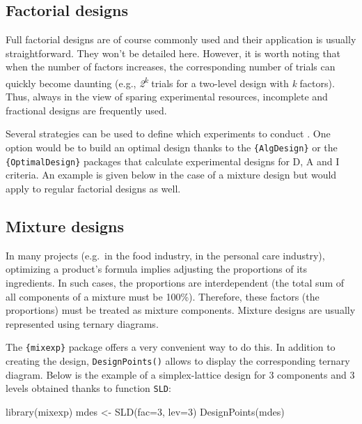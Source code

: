 \documentclass[
]{krantz}
\makeatletter
\newenvironment{Shaded}{\begin{snugshade}}{\end{snugshade}}
\newcommand{\AttributeTok}[1]{\textcolor[rgb]{0.61,0.61,0.61}{#1}}
\newcommand{\DecValTok}[1]{\textcolor[rgb]{0.06,0.06,0.06}{#1}}
\newcommand{\FunctionTok}[1]{\textcolor[rgb]{0,0,0}{#1}}
\newcommand{\NormalTok}[1]{#1}
\newcommand{\OtherTok}[1]{\textcolor[rgb]{0.37,0.37,0.37}{#1}}
\newenvironment{kframe}{%
\medskip{}
\setlength{\fboxsep}{.8em}
 \def\at@end@of@kframe{}%
 \ifinner\ifhmode%
  \def\at@end@of@kframe{\end{minipage}}%
  \begin{minipage}{\columnwidth}%
 \fi\fi%
 \def\FrameCommand##1{\hskip\@totalleftmargin \hskip-\fboxsep
 \colorbox{shadecolor}{##1}\hskip-\fboxsep
     \hskip-\linewidth \hskip-\@totalleftmargin \hskip\columnwidth}%
 \MakeFramed {\advance\hsize-\width
   \@totalleftmargin\z@ \linewidth\hsize
   \@setminipage}}%
 {\par\unskip\endMakeFramed%
 \at@end@of@kframe}
\renewenvironment{Shaded}{\begin{kframe}}{\end{kframe}}
\makeatother
\begin{document}
\hypertarget{factorial-designs}{%
\subsection{Factorial designs}\label{factorial-designs}}

Full factorial designs are of course commonly used and their application is usually straightforward. They won't be detailed here. However, it is worth noting that when the number of factors increases, the corresponding number of trials can quickly become daunting (e.g., \emph{2\textsuperscript{k}} trials for a two-level design with \emph{k} factors). Thus, always in the view of sparing experimental resources, incomplete and fractional designs are frequently used.

Several strategies can be used to define which experiments to conduct \citep[\citet{Lawson2014}, \citet{Rasch2011}]{Dean2017}. One option would be to build an optimal design thanks to the \texttt{\{AlgDesign\}} or the \texttt{\{OptimalDesign\}} packages that calculate experimental designs for D, A and I criteria. An example is given below in the case of a mixture design but would apply to regular factorial designs as well.

\hypertarget{mixture-designs}{%
\subsection{Mixture designs}\label{mixture-designs}}

In many projects (e.g.~in the food industry, in the personal care industry), optimizing a product's formula implies adjusting the proportions of its ingredients. In such cases, the proportions are interdependent (the total sum of all components of a mixture must be 100\%). Therefore, these factors (the proportions) must be treated as mixture components. Mixture designs are usually represented using ternary diagrams.

The \texttt{\{mixexp\}} package offers a very convenient way to do this. In addition to creating the design, \texttt{DesignPoints()} allows to display the corresponding ternary diagram. Below is the example of a simplex-lattice design for 3 components and 3 levels obtained thanks to function \texttt{SLD}:

\begin{Shaded}
\begin{Highlighting}[]
\FunctionTok{library}\NormalTok{(mixexp)}
\NormalTok{mdes }\OtherTok{\textless{}{-}} \FunctionTok{SLD}\NormalTok{(}\AttributeTok{fac=}\DecValTok{3}\NormalTok{, }\AttributeTok{lev=}\DecValTok{3}\NormalTok{)}
\FunctionTok{DesignPoints}\NormalTok{(mdes)}
\end{Highlighting}
\end{Shaded}
\end{document}
